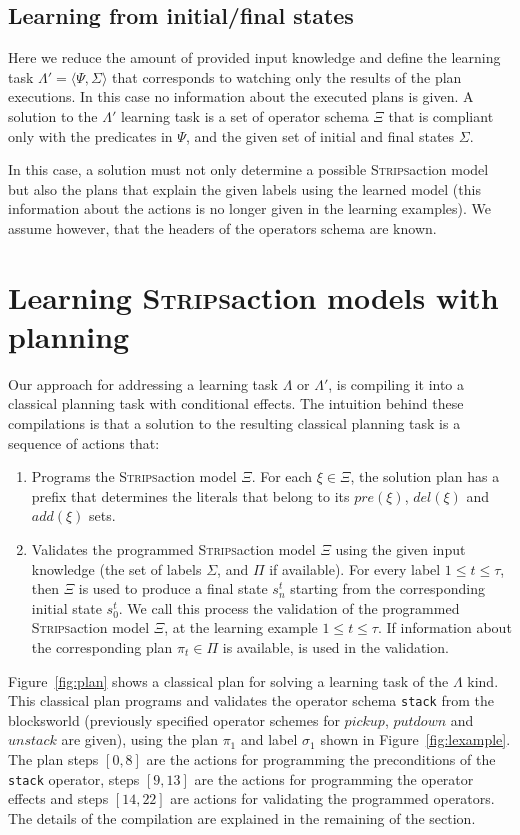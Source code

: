 \documentclass[letterpaper]{article} %
\newcommand{\tup}[1]{{\langle #1 \rangle}}
\newcommand{\strips}{\textsc{Strips}}     %
\begin{document}
\subsection{Learning from initial/final states}
Here we reduce the amount of provided input knowledge and define the learning task $\Lambda'=\tup{\Psi,\Sigma}$ that corresponds to watching only the results of the plan executions. In this case no information about the executed plans is given. A solution to the $\Lambda'$ learning task is a set of operator schema $\Xi$ that is compliant only with the predicates in $\Psi$, and the given set of initial and final states $\Sigma$.

In this case, a solution must not only determine a possible \strips action model but also the plans that explain the given labels using the learned model (this information about the actions is no longer given in the learning examples). We assume however, that the headers of the operators schema are known.


\section{Learning \strips action models with planning}
Our approach for addressing a learning task $\Lambda$ or $\Lambda'$, is compiling it into a classical planning task with conditional effects. The intuition behind these compilations is that a solution to the resulting classical planning task is a sequence of actions that:
\begin{enumerate}
\item Programs the \strips action model $\Xi$. For each $\xi\in\Xi$, the solution plan has a prefix that determines the literals that belong to its $pre(\xi)$, $del(\xi)$ and $add(\xi)$ sets.
\item Validates the programmed \strips action model $\Xi$ using the given input knowledge (the set of labels $\Sigma$, and $\Pi$ if available).  For every label {\small $1\leq t\leq \tau$}, then $\Xi$ is used to produce a final state $s_{n}^t$ starting from the corresponding initial state $s_0^t$. We call this process the validation of the programmed \strips action model $\Xi$, at the learning example {\small $1\leq t\leq \tau$}. If information about the corresponding plan $\pi_t\in \Pi$ is available, is used in the validation.
\end{enumerate}

Figure~\ref{fig:plan} shows a classical plan for solving a learning task of the $\Lambda$ kind. This classical plan programs and validates the operator schema {\tt\small stack} from the blocksworld (previously specified operator schemes for $pickup$, $putdown$ and $unstack$ are given), using the plan $\pi_1$ and label $\sigma_1$ shown in Figure~\ref{fig:lexample}. The plan steps $[0,8]$ are the actions for programming the preconditions of the {\tt\small stack} operator, steps $[9,13]$ are the actions for programming the operator effects and steps $[14,22]$ are actions for validating the programmed operators. The details of the compilation are explained in the remaining of the section.
\end{document}
